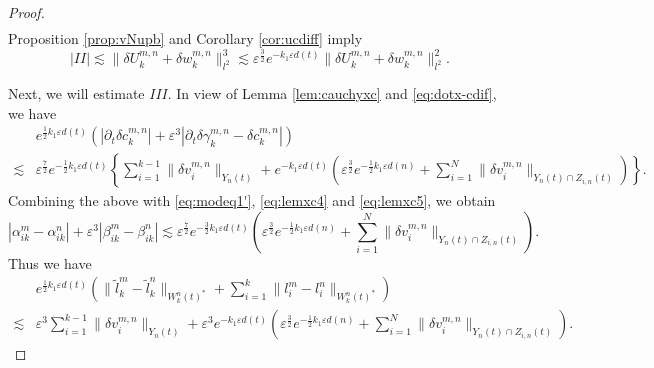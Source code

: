 \documentclass[11pt]{amsart}
\theoremstyle{remark}
\numberwithin{equation}{section}
\begin{document}
\begin{proof}
\begin{equation}
\begin{split}
\end{split}
\end{equation}
Proposition \ref{prop:vNupb} and Corollary \ref{cor:ucdiff} imply
\begin{equation}
  \label{eq:lemen2}
|II|\lesssim \|{\delta U}_k^{m,n}+{\delta w}^{m,n}_k\|_{l^2}^3 \lesssim 
{\varepsilon}^{\frac32}e^{-k_1{\varepsilon} d(t)} \|{\delta U}_k^{m,n}+{\delta w}^{m,n}_k\|_{l^2}^2.  
\end{equation}
\par
Next, we will estimate $III$.
In view of Lemma \ref{lem:cauchyxc} and \eqref{eq:dotx-cdif}, we have
\begin{align*}
&  e^{\frac12k_1{\varepsilon} d(t)}(|{\partial}_t{\delta c}^{m,n}_k|+{\varepsilon}^3|{\partial}_t{\delta\gamma}^{m,n}_k-{\delta c}^{m,n}_k|)
\\ \lesssim & {\varepsilon}^{\frac72}e^{-\frac12k_1{\varepsilon} d(t)}\left\{
\sum_{i=1}^{k-1}\|{\delta v}_i^{m,n}\|_{Y_n(t)}
+e^{-k_1{\varepsilon} d(t)}\left({\varepsilon}^{\frac32}e^{-\frac12k_1{\varepsilon} d(n)}
+\sum_{i=1}^N \|{\delta v}_i^{m,n}\|_{Y_n(t)\cap Z_{i,n}(t)}\right)\right\}.
\end{align*}
Combining the above with \eqref{eq:modeq1'}, \eqref{eq:lemxc4} and
\eqref{eq:lemxc5}, we obtain
$$|\alpha_{ik}^m-\alpha_{ik}^n|+{\varepsilon}^3|\beta_{ik}^m-\beta_{ik}^n|
\lesssim {\varepsilon}^{\frac72}e^{-\frac32k_1{\varepsilon} d(t)}\left({\varepsilon}^{\frac32}e^{-\frac12k_1{\varepsilon} d(n)}+
\sum_{i=1}^N \|{\delta v}_i^{m,n}\|_{Y_n(t)\cap Z_{i,n}(t)}\right).$$
Thus we have 
\begin{align*}
& e^{\frac12k_1{\varepsilon} d(t)}\left(\|\tilde{l}_k^m-\tilde{l}_k^n\|_{W_k^n(t)^*}
+\sum_{i=1}^k\|l_i^m-l_i^n\|_{W_k^n(t)^*}\right)
\\ \lesssim & {\varepsilon}^3\sum_{i=1}^{k-1}\|{\delta v}_i^{m,n}\|_{Y_n(t)}
+{\varepsilon}^3e^{-k_1{\varepsilon} d(t)}\left({\varepsilon}^{\frac32}e^{-\frac12k_1{\varepsilon} d(n)}
+\sum_{i=1}^N\|{\delta v}_i^{m,n}\|_{Y_n(t)\cap Z_{i,n}(t)}\right).
\end{align*}
\par


\end{proof}
\end{document}
